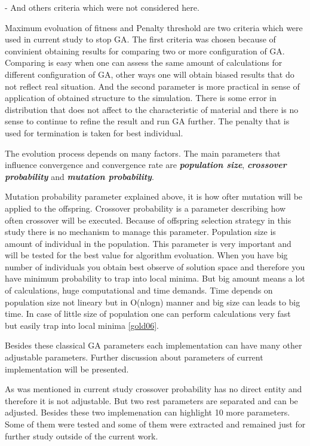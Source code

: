 \documentclass[12pt]{report}
\begin{document}
- And others criteria which were not considered here.

Maximum evoluation of fitness and Penalty threshold are two criteria which were used in current study to stop GA. The first criteria was chosen because of convinient obtaining results for comparing two or more configuration of GA. Comparing is easy when one can assess the same amount of calculations for different configuration of GA, other ways one will obtain biased results that do not reflect real situation. And the second parameter is more practical in sense of application of obtained structure to the simulation. There is some error in distribution that does not affect to the characteristic of material and there is no sense to continue to refine the result and run GA further. The penalty that is used for termination is taken for best individual.

The evolution process depends on many factors. The main parameters that influence convergence and convergence rate are \textit{\textbf{population size}}, \textit{\textbf{crossover probability}} and \textit{\textbf{mutation probability}}.

Mutation probability parameter explained above, it is how ofter mutation will be applied to the offspring. Crossover probability is a parameter describing how often crossover will be executed. Because of offspring selection strategy in this study there is no mechanism to manage this parameter. Population size is amount of individual in the population. This parameter is very important and will be tested for the best value for algorithm evoluation. When you have big number of individuals you obtain best observe of solution space and therefore you have minimum probability to trap into local minima. But big amount means a lot of calculations, huge computational and time demands. Time depends on population size not lineary but in O(nlogn) manner and big size can leads to big time. In case of little size of population one can perform calculations very fast but easily trap into local minima \ref{gold06}.

Besides these classical GA parameters each implementation can have many other adjustable parameters. Further discussion about parameters of current implementation will be presented.

As was mentioned in current study crossover probability has no direct entity and therefore it is not adjustable. But two rest parameters are separated and can be adjusted. Besides these two implemenation can highlight 10 more parameters. Some of them were tested and some of them were extracted and remained just for further study outside of the current work.
\end{document}
